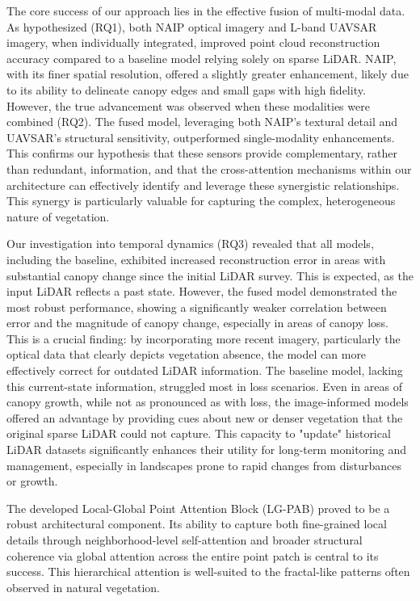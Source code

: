 \documentclass[remotesensing,article,submit,pdftex,moreauthors]{Definitions/mdpi}
\begin{document}
The core success of our approach lies in the effective fusion of multi-modal data. As hypothesized (RQ1), both NAIP optical imagery and L-band UAVSAR imagery, when individually integrated, improved point cloud reconstruction accuracy compared to a baseline model relying solely on sparse LiDAR. NAIP, with its finer spatial resolution, offered a slightly greater enhancement, likely due to its ability to delineate canopy edges and small gaps with high fidelity. However, the true advancement was observed when these modalities were combined (RQ2). The fused model, leveraging both NAIP's textural detail and UAVSAR's structural sensitivity, outperformed single-modality enhancements. This confirms our hypothesis that these sensors provide complementary, rather than redundant, information, and that the cross-attention mechanisms within our architecture can effectively identify and leverage these synergistic relationships. This synergy is particularly valuable for capturing the complex, heterogeneous nature of vegetation.

Our investigation into temporal dynamics (RQ3) revealed that all models, including the baseline, exhibited increased reconstruction error in areas with substantial canopy change since the initial LiDAR survey. This is expected, as the input LiDAR reflects a past state. However, the fused model demonstrated the most robust performance, showing a significantly weaker correlation between error and the magnitude of canopy change, especially in areas of canopy loss. This is a crucial finding: by incorporating more recent imagery, particularly the optical data that clearly depicts vegetation absence, the model can more effectively correct for outdated LiDAR information. The baseline model, lacking this current-state information, struggled most in loss scenarios. Even in areas of canopy growth, while not as pronounced as with loss, the image-informed models offered an advantage by providing cues about new or denser vegetation that the original sparse LiDAR could not capture. This capacity to "update" historical LiDAR datasets significantly enhances their utility for long-term monitoring and management, especially in landscapes prone to rapid changes from disturbances or growth.

The developed Local-Global Point Attention Block (LG-PAB) proved to be a robust architectural component. Its ability to capture both fine-grained local details through neighborhood-level self-attention and broader structural coherence via global attention across the entire point patch is central to its success. This hierarchical attention is well-suited to the fractal-like patterns often observed in natural vegetation.
\end{document}
